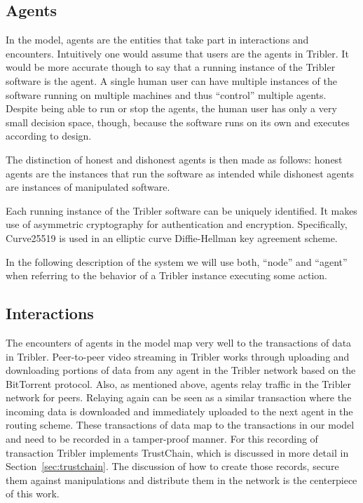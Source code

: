 \subsection{Agents}
In the model, agents are the entities that take part in interactions and encounters. Intuitively one
would assume that users are the agents in Tribler. It would be more accurate though to say that a 
running instance of the Tribler software is the agent. A single human user can have multiple 
instances of the software running on multiple machines and thus ``control'' multiple agents. Despite
being able to run or stop the agents, the human user has only a very small decision space, though, 
because the software runs on its own and executes according to design. 

The distinction of honest and dishonest agents is then made as follows: honest agents are the 
instances that run the software as intended while dishonest agents are instances of manipulated 
software. 

Each running instance of the Tribler software can be uniquely identified. It makes use of asymmetric
cryptography for authentication and encryption. Specifically, Curve25519 is used in an 
elliptic curve Diffie-Hellman key agreement scheme. 

In the following description of the system we will use both, ``node'' and ``agent'' when referring to the 
behavior of a Tribler instance executing some action. 

\subsection{Interactions}
The encounters of agents in the model map very well to the transactions
of data in Tribler. Peer-to-peer video streaming in Tribler works through uploading and downloading 
portions of data from any agent in the Tribler network based on the BitTorrent protocol. Also, as
mentioned above, agents relay traffic in the Tribler network for peers. Relaying again can be seen 
as a similar transaction where the incoming data is downloaded and immediately uploaded to the next
agent in the routing scheme. These transactions of data map to the transactions in our model and 
need to be recorded in a tamper-proof manner. For this recording of transaction Tribler implements 
TrustChain, which is discussed in 
more detail in Section~\ref{sec:trustchain}. The discussion of how to create those records, secure 
them against manipulations and distribute them in the network is the centerpiece of this work.

